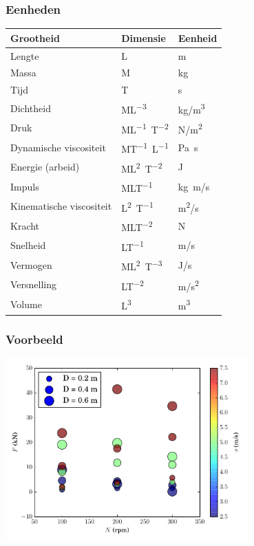 \documentclass[t]{beamer}
\begin{document}
	\begin{frame}
		\frametitle{Eenheden}
		\center
		\begin{tabular}{lll}
			\hline
			Grootheid                   & Dimensie   & Eenheid \\
			\hline
			Lengte                       & \unit{L}                      &   \unit{m} \\
			Massa                        & \unit{M}                      &   \unit{kg} \\
			Tijd                         & \unit{T}                      &   \unit{s} \\
			Dichtheid                    & \unit{ML^{-3}}                &   \unit{kg/m^3} \\
			Druk                         & \unit{ML^{-1}T^{-2}}          &   \unit{N/m^2} \\	
			Dynamische viscositeit       & \unit{MT^{-1}L^{-1}}          &   \unit{Pa s} \\
			Energie (arbeid)             & \unit{ML^{2}T^{-2}}           &   \unit{J} \\
			Impuls                       & \unit{MLT^{-1}}               &   \unit{kg m/s} \\
			Kinematische viscositeit     & \unit{L^{2}T^{-1}}            &   \unit{m^2/s} \\
			Kracht                       & \unit{MLT^{-2}}               &   \unit{N} \\
			Snelheid                     & \unit{LT^{-1}}                &   \unit{m/s} \\
			Vermogen                     & \unit{ML^{2}T^{-3}}           &   \unit{J/s} \\
			Versnelling                  & \unit{LT^{-2}}                &   \unit{m/s^2} \\
			Volume                       & \unit{L^3}                    &   \unit{m^3} \\
			\hline
		\end{tabular}
	\end{frame}	
	\begin{frame}
		\frametitle{Voorbeeld}
		\center
        \includegraphics[height=7cm]{fig/gelijkvormigheid/Dimensieanalyse_voorbeeld_data}
	\end{frame}	
\end{document}
